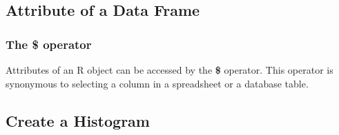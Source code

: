 \subsection{Attribute of a Data Frame}
\subsubsection{The \textbf{\$} operator}
\noindent Attributes of an R object can be accessed by the \textbf{\$} operator. This operator is synonymous to selecting a column in a spreadsheet or a database table.
\begin{knitrout}
\color{fgcolor}\begin{kframe}
\begin{alltt}
\hlkwb{<-}\hlopt{$} 
\end{alltt}
\end{kframe}
\end{knitrout}
\subsection{Create a Histogram}
